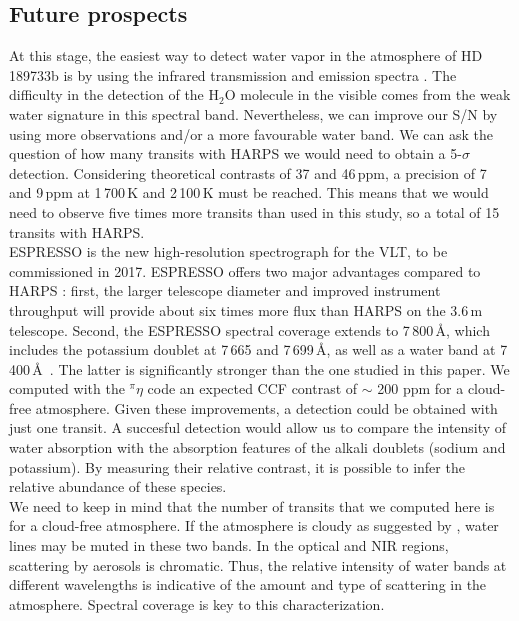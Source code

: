 \documentclass{aa}
\begin{document}
	\subsection{Future prospects}
At this stage, the easiest way to detect water vapor in the atmosphere of HD\,189733b is by using the infrared transmission and emission spectra \citep{mccullough_water_2014,de_kok_detection_2013,brogi_rotation_2016}. The difficulty in the detection of the H$_2$O molecule in the visible comes from the weak water signature in this spectral band. Nevertheless, we can improve our S/N by using more observations and/or a more favourable water band. We can ask the question of how many transits with HARPS we would need to obtain a 5-$\sigma$ detection. Considering theoretical contrasts of 37 and 46\,ppm, a precision of 7 and 9\,ppm at 1\,700\,K and 2\,100\,K must be reached. This means that we would need to observe five times more transits than used in this study, so a total of 15 transits with HARPS.\\
ESPRESSO \citep{pepe_espresso_2010} is the new high-resolution spectrograph for the VLT, to be commissioned in 2017. ESPRESSO offers two major advantages compared to HARPS : first, the larger telescope diameter and improved instrument throughput will provide about six times more flux than HARPS on the 3.6\,m telescope. Second, the ESPRESSO spectral coverage extends to 7\,800\,\AA, which includes the potassium doublet at 7\,665 and 7\,699\,\AA, as well as a water band at 7\,400\,\AA\ . The latter is significantly stronger than the one studied in this paper. We computed with the $^\pi \eta$ code an expected CCF contrast of $\sim$ 200 ppm for a cloud-free atmosphere. Given these improvements, a detection could be obtained with just one transit. A succesful detection would allow us to compare the intensity of water absorption with the absorption features of the alkali doublets (sodium and potassium). By measuring their relative contrast, it is possible to infer the relative abundance of these species.\\
We need to keep in mind that the number of transits that we computed here is for a cloud-free atmosphere. If the atmosphere is cloudy as suggested by \citet{lecavelier_des_etangs_rayleigh_2008,pont_detection_2008,huitson_temperaturepressure_2012,pont_prevalence_2013,mccullough_water_2014}, water lines may be muted in these two bands. In the optical and NIR regions, scattering by aerosols is chromatic. Thus, the relative intensity of water bands at different wavelengths is indicative of the amount and type of scattering in the atmosphere. Spectral coverage is key to this characterization.
\label{harps to espresso}
\end{document}
